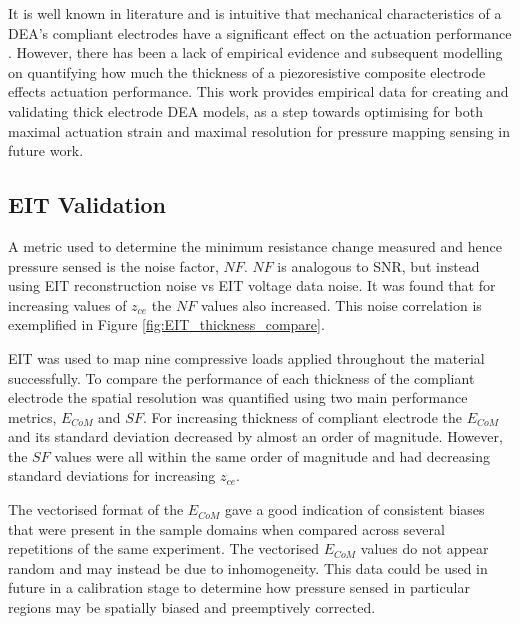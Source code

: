 It is well known in literature and is intuitive that mechanical characteristics of a DEA's compliant electrodes have a significant effect on the actuation performance \cite{Carpi2003, Zhang2020}. However, there has been a lack of empirical evidence and subsequent modelling on quantifying how much the thickness of a piezoresistive composite electrode effects actuation performance. This work provides empirical data for creating and validating thick electrode DEA models, as a step towards optimising for both maximal actuation strain and maximal resolution for pressure mapping sensing in future work. 


\subsection{EIT Validation}
A metric used to determine the minimum resistance change measured and hence pressure sensed is the noise factor, $N\!F$. $N\!F$ is analogous to SNR, but instead using EIT reconstruction noise vs EIT voltage data noise. It was found that for increasing values of $z_{ce}$ the $N\!F$ values also increased. This noise correlation is exemplified in Figure \ref{fig:EIT_thickness_compare}.

EIT was used to map nine compressive loads applied throughout the material successfully. To compare the performance of each thickness of the compliant electrode the spatial resolution was quantified using two main performance metrics, $E_{CoM}$ and $S\!F$. For increasing thickness of compliant electrode the $E_{CoM}$ and its standard deviation decreased by almost an order of magnitude. However, the $S\!F$ values were all within the same order of magnitude and had decreasing standard deviations for increasing $z_{ce}$.

The vectorised format of the $E_{CoM}$ gave a good indication of consistent biases that were present in the sample domains when compared across several repetitions of the same experiment. The vectorised $E_{CoM}$ values do not appear random and may instead be due to inhomogeneity. This data could be used in future in a calibration stage to determine how pressure sensed in particular regions may be spatially biased and preemptively corrected.

